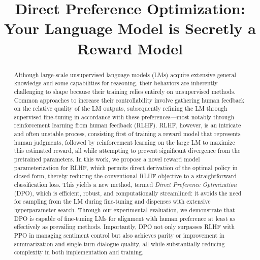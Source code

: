 \title{Direct Preference Optimization: Your Language Model is Secretly a Reward Model}

\begin{abstract}
Although large-scale unsupervised language models (LMs) acquire extensive general knowledge and some capabilities for reasoning, their behaviors are inherently challenging to shape because their training relies entirely on unsupervised methods. Common approaches to increase their controllability involve gathering human feedback on the relative quality of the LM outputs, subsequently refining the LM through supervised fine-tuning in accordance with these preferences—most notably through reinforcement learning from human feedback (RLHF). RLHF, however, is an intricate and often unstable process, consisting first of training a reward model that represents human judgments, followed by reinforcement learning on the large LM to maximize this estimated reward, all while attempting to prevent significant divergence from the pretrained parameters. In this work, we propose a novel reward model parameterization for RLHF, which permits direct derivation of the optimal policy in closed form, thereby reducing the conventional RLHF objective to a straightforward classification loss. This yields a new method, termed \textit{Direct Preference Optimization} (DPO), which is efficient, robust, and computationally streamlined: it avoids the need for sampling from the LM during fine-tuning and dispenses with extensive hyperparameter search. Through our experimental evaluation, we demonstrate that DPO is capable of fine-tuning LMs for alignment with human preference at least as effectively as prevailing methods. Importantly, DPO not only surpasses RLHF with PPO in managing sentiment control but also achieves parity or improvement in summarization and single-turn dialogue quality, all while substantially reducing complexity in both implementation and training.
\end{abstract}

